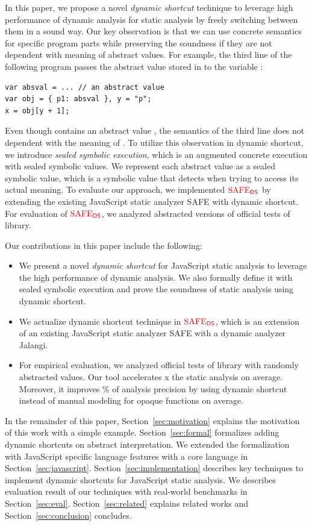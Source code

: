 In this paper, we propose a novel \textit{dynamic shortcut} technique to
leverage high performance of dynamic analysis for static analysis by freely
switching between them in a sound way.  Our key observation is that we can
use concrete semantics for specific program parts while preserving the soundness
if they are not dependent with meaning of abstract values.  For example, the
third line of the following program passes the abstract value 
stored in  to the variable :
\begin{lstlisting}[style=myJSstyle,numbers=none]
var absval = ... // an abstract value
var obj = { p1: absval }, y = "p";
x = obj[y + 1];
\end{lstlisting}
Even though  contains an abstract value , the
semantics of the third line does not dependent with the meaning of
.  To utilize this observation in dynamic shortcut, we introduce
\textit{sealed symbolic execution}, which is an augmented concrete execution
with sealed symbolic values.  We represent each abstract value as a sealed
symbolic value, which is a symbolic value that detects when trying to access its
actual meaning.  To evaluate our approach, we implemented ${\color{red}{\text{SAFE}_{\textsf{DS}}}}$ by extending
the existing JavaScript static analyzer SAFE with dynamic shortcut.  For
evaluation of ${\color{red}{\text{SAFE}_{\textsf{DS}}}}$, we analyzed abstracted versions of  official
tests of  library.

Our contributions in this paper include the following:
\begin{itemize}
  \item We present a novel \textit{dynamic shortcut} for JavaScript static
    analysis to leverage the high performance of dynamic analysis.  We also
    formally define it with sealed symbolic execution and prove the soundness of
    static analysis using dynamic shortcut.
  \item We actualize dynamic shortcut technique in ${\color{red}{\text{SAFE}_{\textsf{DS}}}}$, which is an
    extension of an existing JavaScript static analyzer SAFE with a dynamic
    analyzer Jalangi.
  \item For empirical evaluation, we analyzed  official tests of
     library with randomly abstracted values.  Our tool
    accelerates x the static analysis on average.  Moreover, it
    improves \% of analysis precision by using dynamic shortcut
    instead of manual modeling for  opaque functions on average.
\end{itemize}

In the remainder of this paper, Section~\ref{sec:motivation} explains the
motivation of this work with a simple example.  Section~\ref{sec:formal}
formalizes adding dynamic shortcuts on abstract interpretation.  We extended the
formalization with JavaScript specific language features with a core language in
Section~\ref{sec:javascript}.  Section~\ref{sec:implementation} describes
key techniques to implement dynamic shortcuts for JavaScript static analysis.
We describes evaluation result of our techniques with real-world benchmarks in
Section~\ref{sec:eval}.  Section~\ref{sec:related} explains related works and
Section~\ref{sec:conclusion} concludes.
